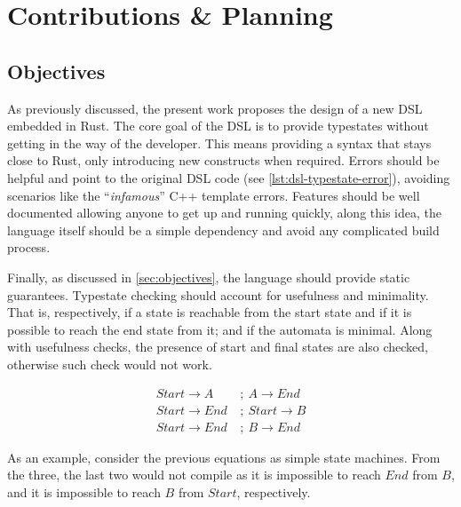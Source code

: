 \chapter{Contributions \& Planning}\label{cha:planning}


\section{Objectives}

As previously discussed, the present work proposes the design of a new DSL embedded in Rust.
The core goal of the DSL is to provide typestates without getting in the way of the developer.
This means providing a syntax that stays close to Rust, only introducing new constructs when required.
Errors should be helpful and point to the original DSL code (see \autoref{lst:dsl-typestate-error}), avoiding scenarios like the “\emph{infamous}” C++ template errors.
Features should be well documented allowing anyone to get up and running quickly,
along this idea, the language itself should be a simple dependency and avoid any complicated build process.

Finally, as discussed in \autoref{sec:objectives}, the language should provide static guarantees.
Typestate checking should account for usefulness and minimality.
That is, respectively, if a state is reachable from the start state and if it is possible to reach the end state from it;
and if the automata is minimal.
Along with usefulness checks, the presence of start and final states are also checked,
otherwise such check would not work.

\begin{align}
    Start \rightarrow A~   & ;~A \rightarrow End   \\
    Start \rightarrow End~ & ;~Start \rightarrow B \\
    Start \rightarrow End~ & ;~B \rightarrow End
\end{align}

As an example, consider the previous equations as simple state machines.
From the three, the last two would not compile as it is impossible to reach $End$ from $B$, and it is impossible to reach $B$ from $Start$, respectively.

